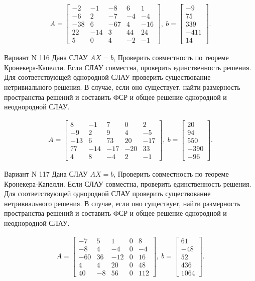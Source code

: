 \documentclass[11pt]{report}
\begin{document}
\begin{align*}
 A = \left[\begin{matrix}-2 & -1 & -8 & 6 & 1\\-6 & 2 & -7 & -4 & -4\\-38 & 6 & -67 & 4 & -16\\22 & -14 & 3 & 44 & 24\\5 & 0 & 4 & -2 & -1\end{matrix}\right],
\ b = \left[\begin{matrix}-9\\75\\339\\-411\\14\end{matrix}\right]. 
 \end{align*}

Вариант N 116
Дана СЛАУ $AX = b$,
Проверить совместность по теореме Кронекера-Капелли. Если СЛАУ совместна, проверить единственность решения.
Для соответствующей однородной СЛАУ проверить существование нетривиального решения. В случае, если оно существует,
найти размерность пространства решений и составить ФСР и общее решение однородной  и неоднородной СЛАУ.


\begin{align*}
 A = \left[\begin{matrix}8 & -1 & 7 & 0 & 2\\-9 & 2 & 9 & 4 & -5\\-13 & 6 & 73 & 20 & -17\\77 & -14 & -17 & -20 & 33\\4 & 8 & -4 & 2 & -1\end{matrix}\right],
\ b = \left[\begin{matrix}20\\94\\550\\-390\\-96\end{matrix}\right]. 
 \end{align*}

Вариант N 117
Дана СЛАУ $AX = b$,
Проверить совместность по теореме Кронекера-Капелли. Если СЛАУ совместна, проверить единственность решения.
Для соответствующей однородной СЛАУ проверить существование нетривиального решения. В случае, если оно существует,
найти размерность пространства решений и составить ФСР и общее решение однородной  и неоднородной СЛАУ.


\begin{align*}
 A = \left[\begin{matrix}-7 & 5 & 1 & 0 & 8\\-8 & 4 & -4 & 0 & -4\\-60 & 36 & -12 & 0 & 16\\4 & 4 & 20 & 0 & 48\\40 & -8 & 56 & 0 & 112\end{matrix}\right],
\ b = \left[\begin{matrix}61\\-48\\52\\436\\1064\end{matrix}\right]. 
 \end{align*}
\end{document}
